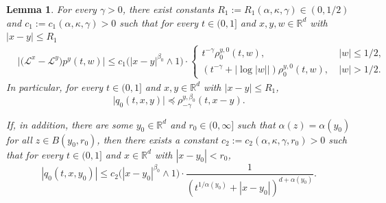 \documentclass[a4paper,11pt]{amsart}
\renewcommand{\le}{\leqslant}
\newcommand{\R}{\mathds R}
\newcommand{\B}{\beta}
\newcommand{\p}{\preceq}
\newcommand{\K}{\kappa}
\newcommand{\A}{\alpha}
\newcommand{\G}{\gamma}
\def\LL{{\mathcal L}}
\newtheorem{lemma}[theorem]{Lemma}
\theoremstyle{definition}
\begin{document}
\begin{lemma}\label{l1-2}
For every $\G>0$, there exist constants $R_1:=R_1(\A,\K,\G)\in (0,{1}/{2})$ and $c_1:=c_1(\A,\K,\G)>0$ such that
for every $t \in (0,1]$ and $x,y,w\in \R^d$ with $|x-y|\le R_1$
\begin{equation}\label{l1-2-1}\begin{split}
&\big|\big( \LL^x - \LL^y\big)p^y(t,w)\big| \le c_1\big(|x-y|^{\B_0}\wedge 1\big)
\cdot
\begin{cases}
t^{-\G}\rho_0^{y,0}(t,w), &\ |w|\le {1}/{2},\\
(t^{-\G}+|\log |w||)\rho_0^{y,0}(t,w),&\ |w|>{1}/{2}.
\end{cases}\end{split}
\end{equation} In particular, for every $t\in(0,1]$ and $x,y\in\R^d$ with $|x-y|\le R_1$,
\begin{equation}\label{l1-2-1a}
\big|q_0(t,x,y)\big|\p \rho_{-\G}^{y,\B_0}(t,x-y).
\end{equation}

If, in addition, there are some $y_0\in \R^d$ and $r_0\in(0,\infty]$ such that $\alpha(z)=\alpha(y_0)$ for all $z \in B(y_0,r_0)$,
then
there exists a constant
$c_2:=c_2(\A,\K, \G, r_0)>0$ such that for every $t\in(0,1]$ and $x \in \R^d$ with $|x-y_0|<r_0$,
\begin{equation}\label{l1-2-1b}
|q_0(t,x,y_0)|\le c_2\big(|x-y_0|^{\beta_0}\wedge 1\big)\cdot
\frac{1}{(t^{{1/\A(y_0)}}+|x-y_0|)^{d+\A(y_0)}}.
\end{equation}
\end{lemma}
\end{document}
